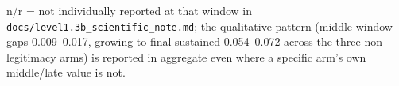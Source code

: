 \begin{table}[htbp]
\centering
\caption{Level 1.3b Stage 6 sham-controlled history-erasure/reversal/
equalization intervention: mean $|S_{\text{obs}}|$ gap versus control by
window (12 matched seeds per arm).}
\label{tab:history-intervention}

\medskip
\noindent\footnotesize n/r = not individually reported at that window in
\texttt{docs/level1.3b\_scientific\_note.md}; the qualitative pattern
(middle-window gaps 0.009--0.017, growing to final-sustained 0.054--0.072
across the three non-legitimacy arms) is reported in aggregate even where
a specific arm's own middle/late value is not.
\normalsize
\end{table}
